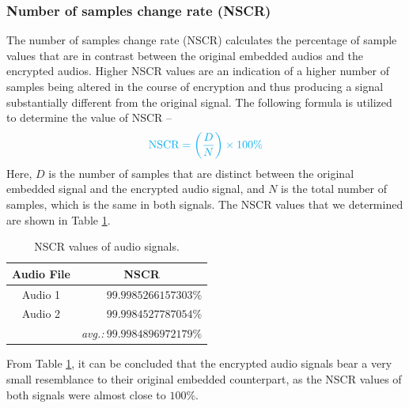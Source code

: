 \documentclass[a4paper]{cas-sc}
\begin{document}
\subsubsection{Number of samples change rate (NSCR)}
The number of samples change rate (NSCR) calculates the percentage of sample values that are in contrast between the original embedded audios and the encrypted audios. Higher NSCR values are an indication of a higher number of samples being altered in the course of encryption and thus producing a signal substantially different from the original signal. The following formula is utilized to determine the value of NSCR --
\begin{equation}
    \textcolor{cyan}{\text{NSCR}=\left(\frac{D}{N}\right)\times100\%}
\end{equation}
Here, $D$ is the number of samples that are distinct between the original embedded signal and the encrypted audio signal, and $N$ is the total number of samples, which is the same in both signals. The NSCR values that we determined are shown in Table \ref{table:nscr}.
\begin{table}[pos=h]
    \begin{center}
        \caption{NSCR values of audio signals.}
        \begin{tabular}{cr}
            \hline
            \multicolumn{1}{c|}{Audio File} & \multicolumn{1}{c}{NSCR}                     \\ \hline
            \multicolumn{1}{c|}{Audio 1}    & $99.9985266157303\%$                         \\ %
            \multicolumn{1}{c|}{Audio 2}    & $99.9984527787054\%$                         \\ \hline
                                            & \textit{avg.:}$\mathbf{~99.9984896972179\%}$
        \end{tabular}
        \label{table:nscr}
    \end{center}
\end{table}

From Table \ref{table:nscr}, it can be concluded that the encrypted audio signals bear a very small resemblance to their original embedded counterpart, as the NSCR values of both signals were almost close to $100\%$.
\end{document}
